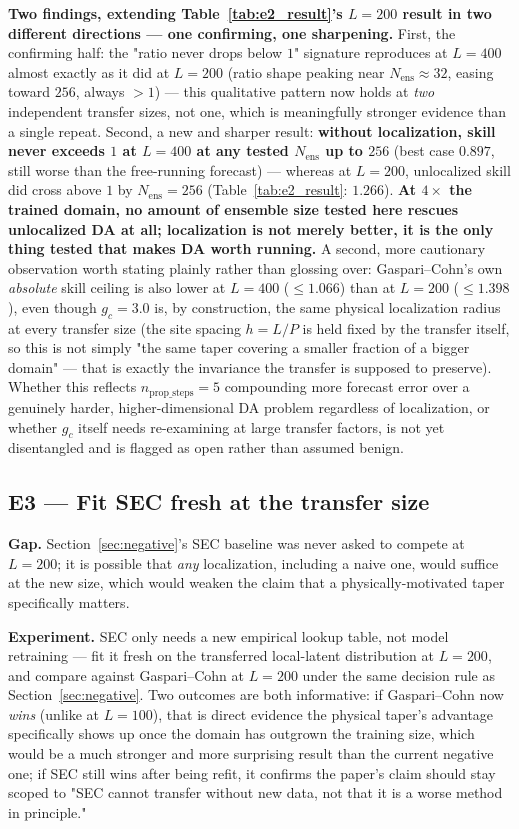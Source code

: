 \documentclass[11pt]{article}
\begin{document}
\textbf{Two findings, extending Table~\ref{tab:e2_result}'s $L=200$
result in two different directions --- one confirming, one
sharpening.} First, the confirming half: the "ratio never drops below
$1$" signature reproduces at $L=400$ almost exactly as it did at
$L=200$ (ratio shape peaking near $N_{\mathrm{ens}}\approx32$, easing
toward $256$, always $>1$) --- this qualitative pattern now holds at
\emph{two} independent transfer sizes, not one, which is meaningfully
stronger evidence than a single repeat. Second, a new and sharper
result: \textbf{without localization, skill never exceeds $1$ at
$L=400$ at any tested $N_{\mathrm{ens}}$ up to $256$} (best case
$0.897$, still worse than the free-running forecast) --- whereas at
$L=200$, unlocalized skill did cross above $1$ by $N_{\mathrm{ens}}=256$
(Table~\ref{tab:e2_result}: $1.266$). \textbf{At $4\times$ the trained
domain, no amount of ensemble size tested here rescues unlocalized DA
at all; localization is not merely better, it is the only thing tested
that makes DA worth running.} A second, more cautionary observation
worth stating plainly rather than glossing over: Gaspari--Cohn's own
\emph{absolute} skill ceiling is also lower at $L=400$ ($\leq1.066$)
than at $L=200$ ($\leq1.398$), even though $g_c=3.0$ is, by
construction, the same physical localization radius at every transfer
size (the site spacing $h=L/P$ is held fixed by the transfer itself,
so this is not simply "the same taper covering a smaller fraction of a
bigger domain" --- that is exactly the invariance the transfer is
supposed to preserve). Whether this reflects $n_{\mathrm{prop\_steps}}=5$
compounding more forecast error over a genuinely harder, higher-dimensional
DA problem regardless of localization, or whether $g_c$ itself
needs re-examining at large transfer factors, is not yet
disentangled and is flagged as open rather than assumed benign.

\subsection{E3 --- Fit SEC fresh at the transfer size}
\label{exp:e3}

\textbf{Gap.} Section~\ref{sec:negative}'s SEC baseline was never asked
to compete at $L=200$; it is possible that \emph{any} localization,
including a naive one, would suffice at the new size, which would
weaken the claim that a physically-motivated taper specifically
matters.

\textbf{Experiment.} SEC only needs a new empirical lookup table, not
model retraining --- fit it fresh on the transferred local-latent
distribution at $L=200$, and compare against Gaspari--Cohn at $L=200$
under the same decision rule as Section~\ref{sec:negative}. Two
outcomes are both informative: if Gaspari--Cohn now \emph{wins} (unlike
at $L=100$), that is direct evidence the physical taper's advantage
specifically shows up once the domain has outgrown the training size,
which would be a much stronger and more surprising result than the
current negative one; if SEC still wins after being refit, it confirms
the paper's claim should stay scoped to "SEC cannot transfer without
new data, not that it is a worse method in principle."
\end{document}
